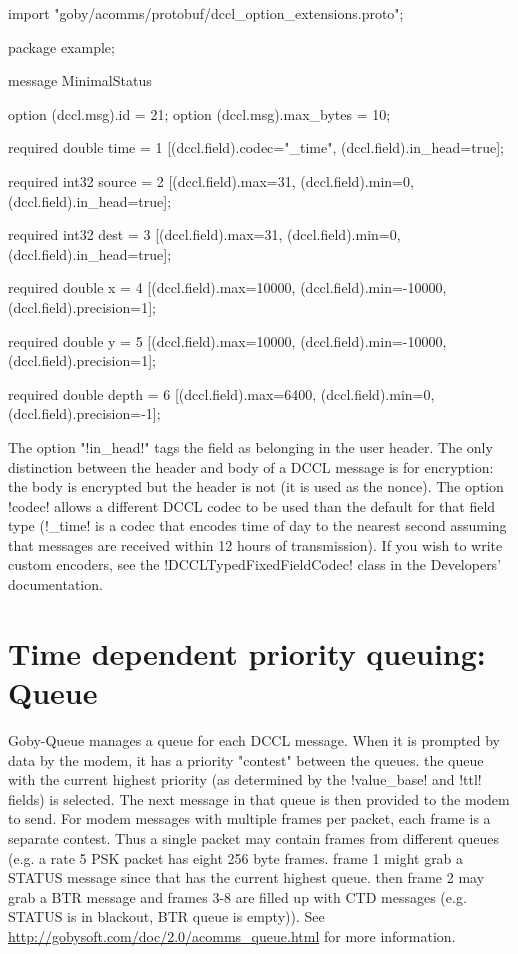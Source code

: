 \begin{boxedverbatim}
import "goby/acomms/protobuf/dccl_option_extensions.proto";

package example;

message MinimalStatus
{ 
  option (dccl.msg).id = 21;
  option (dccl.msg).max_bytes = 10;

  required double time = 1 [(dccl.field).codec="_time",
                            (dccl.field).in_head=true];
  
  required int32 source = 2 [(dccl.field).max=31,
                             (dccl.field).min=0,
                             (dccl.field).in_head=true];

  required int32 dest = 3 [(dccl.field).max=31,
                           (dccl.field).min=0,
                           (dccl.field).in_head=true];
  
  required double x = 4 [(dccl.field).max=10000,
                         (dccl.field).min=-10000,
                         (dccl.field).precision=1];
  
  required double y = 5 [(dccl.field).max=10000,
                         (dccl.field).min=-10000,
                         (dccl.field).precision=1];
  
  required double depth = 6 [(dccl.field).max=6400,
                             (dccl.field).min=0,
                             (dccl.field).precision=-1];
} 
\end{boxedverbatim}
\resetbvlinenumber

The option "!in_head!" tags the field as belonging in the user header. The only distinction between the header and body of a DCCL message is for encryption: the body is encrypted but the header is not (it is used as the nonce). The option !codec! allows a different DCCL codec to be used than the default for that field type (!_time! is a codec that encodes time of day to the nearest second assuming that messages are received within 12 hours of transmission). If you wish to write custom encoders, see the !DCCLTypedFixedFieldCodec! class in the Developers' documentation.

\section{Time dependent priority queuing: Queue} \label{sec:queue}

Goby-Queue manages a queue for each DCCL message. When it is prompted by data by the modem, it has a priority "contest" between the queues. the queue with the current highest priority (as determined by the !value_base! and !ttl! fields) is selected. The next message in that queue is then provided to the modem to send. For modem messages with multiple frames per packet, each frame is a separate contest. Thus a single packet may contain frames from different
 queues (e.g. a rate 5 PSK packet has eight 256 byte frames. frame 1 might grab a STATUS message since that has the current highest queue. then frame 2 may grab a BTR message and frames 3-8 are filled up with CTD messages (e.g. STATUS is in blackout, BTR queue is empty)). See \url{http://gobysoft.com/doc/2.0/acomms_queue.html} for more information.

